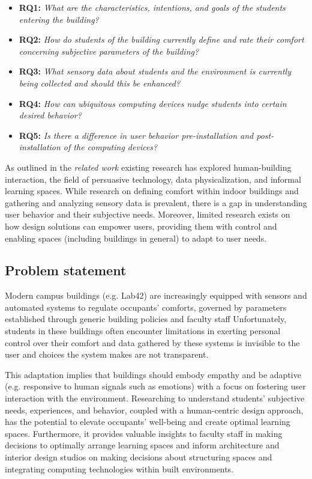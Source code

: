 \begin{itemize}
    \item \textbf{RQ1:} \emph{What are the characteristics, intentions, and goals of the students entering the building? }
    \item \textbf{RQ2:} \emph{How do students of the building currently define and rate their comfort concerning subjective parameters of the building? }
    \item \textbf{RQ3:} \emph{What sensory data about students and the environment is currently being collected and should this be enhanced? }
    \item \textbf{RQ4:} \emph{How can ubiquitous computing devices nudge students into certain desired behavior? }
    \item \textbf{RQ5:} \emph{Is there a difference in user behavior pre-installation and post-installation of the computing devices? }\\
\end{itemize}

As outlined in the \emph{related work} existing research has explored human-building interaction, the field of persuasive technology, data physicalization, and informal learning spaces. While research on defining comfort within indoor buildings and gathering and analyzing sensory data is prevalent, there is a gap in understanding user behavior and their subjective needs. Moreover, limited research exists on how design solutions can empower users, providing them with control and enabling spaces (including buildings in general) to adapt to user needs.

\subsection{Problem statement}

Modern campus buildings (e.g. Lab42) are increasingly equipped with sensors and automated systems to regulate occupants' comforts, governed by parameters established through generic building policies and faculty staff Unfortunately, students in these buildings often encounter limitations in exerting personal control over their comfort and data gathered by these systems is invisible to the user and choices the system makes are not transparent.

This adaptation implies that buildings should embody empathy \cite{empathic} and be adaptive (e.g. responsive to human signals such as emotions) with a focus on fostering user interaction with the environment. Researching to understand students' subjective needs, experiences, and behavior, coupled with a human-centric design approach, has the potential to elevate occupants' well-being and create optimal learning spaces. Furthermore, it provides valuable insights to faculty staff in making decisions to optimally arrange learning spaces and inform architecture and interior design studios on making decisions about structuring spaces and integrating computing technologies within built environments.

